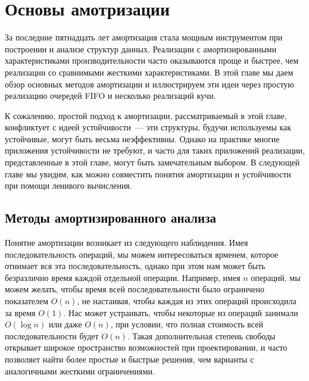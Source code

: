 \chapter{Основы амотризации}
\label{ch:5}

За последние пятнадцать лет амортизация стала мощным инструментом при
построении и анализе структур данных. Реализации с амортизированными
характеристиками производительности часто оказываются проще и быстрее,
чем реализации со сравнимыми жесткими характеристиками. В этой главе
мы даем обзор основных методов амортизации и иллюстрируем эти идеи
через простую реализацию очередей FIFO и несколько реализаций кучи.

К сожалению, простой подход к амортизации, рассматриваемый в этой
главе, конфликтует с идеей устойчивости~--- эти структуры, будучи
используемы как устойчивые, могут быть весьма неэффективны. Однако на
практике многие приложения устойчивости не требуют, и часто для таких
приложений реализации, представленные в этой главе, могут быть
замечательным выбором. В следующей главе мы увидим, как можно
совместить понятия амортизации и устойчивости при помощи ленивого
вычисления.

\section{Методы амортизированного анализа}
\label{sc:5.1}

Понятие амортизации возникает из следующего наблюдения.  Имея
последовательность операций, мы можем интересоваться врменем, которое
отнимает вся эта последовательность, однако при этом нам может быть
безразлично время каждой отдельной операции. Например, имея $n$
операций, мы можем желать, чтобы время всей последовательности было
ограничено показателем $O(n)$, не настаивая, чтобы каждая из этих
операций происходила за время $O(1)$. Нас может устраивать, чтобы
некоторые из операций занимали $O(\log n)$ или даже $O(n)$, при
условии, что полная стоимость всей последовательности будет
$O(n)$. Такая дополнительная степень свободы открывает широкое
пространство возможностей при проектировании, и часто позволяет найти
более простые и быстрые решения, чем варианты с аналогичными жесткими
ограничениями.

